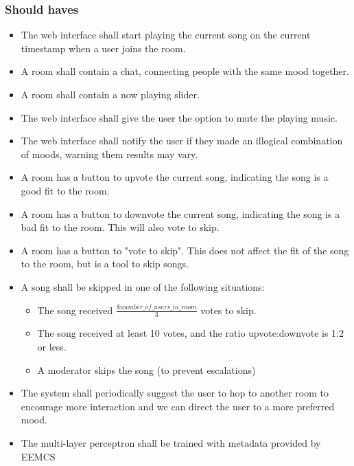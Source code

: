 \subsubsection{Should haves}
\begin{itemize}
\item The web interface shall start playing the current song on the current timestamp when a user joins the room.

\item A room shall contain a chat, connecting people with the same mood together.

\item A room shall contain a now playing slider.

\item The web interface shall give the user the option to mute the playing music.

\item The web interface shall notify the user if they made an illogical combination of moods, warning them results may vary.

\item A room has a button to upvote the current song, indicating the song is a good fit to the room.

\item A room has a button to downvote the current song, indicating the song is a bad fit to the room. This will also vote to skip.

\item A room has a button to "vote to skip". This does not affect the fit of the song to the room, but is a tool to skip songs.

\item A song shall be skipped in one of the following situations:
	\begin{itemize}
	\item The song received $\frac{\$number\_of\_users\_in\_room}{3}$ votes to skip.
	\item The song received at least 10 votes, and the ratio upvote:downvote is 1:2 or less.
	\item A moderator skips the song (to prevent escalations)
	\end{itemize}
	
\item The system shall periodically suggest the user to hop to another room to encourage more interaction and we can direct the user to a more preferred mood.

\item The multi-layer perceptron shall be trained with metadata provided by EEMCS


\end{itemize}
